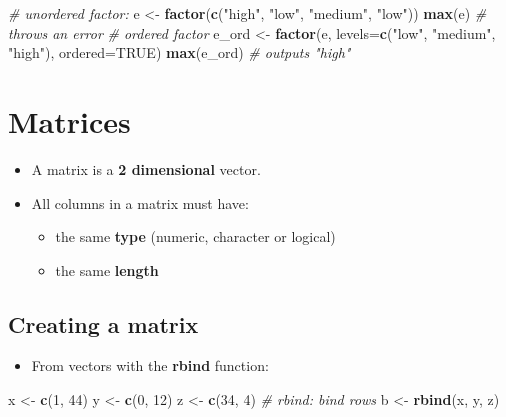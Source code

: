 \documentclass[]{book}
\newenvironment{Shaded}{\begin{snugshade}}{\end{snugshade}}
\newcommand{\CommentTok}[1]{\textcolor[rgb]{0.56,0.35,0.01}{\textit{#1}}}
\newcommand{\DataTypeTok}[1]{\textcolor[rgb]{0.13,0.29,0.53}{#1}}
\newcommand{\DecValTok}[1]{\textcolor[rgb]{0.00,0.00,0.81}{#1}}
\newcommand{\KeywordTok}[1]{\textcolor[rgb]{0.13,0.29,0.53}{\textbf{#1}}}
\newcommand{\NormalTok}[1]{#1}
\newcommand{\OtherTok}[1]{\textcolor[rgb]{0.56,0.35,0.01}{#1}}
\newcommand{\StringTok}[1]{\textcolor[rgb]{0.31,0.60,0.02}{#1}}
\providecommand{\tightlist}{%
  \setlength{\itemsep}{0pt}\setlength{\parskip}{0pt}}
\begin{document}
\begin{Shaded}
\begin{Highlighting}[]
\CommentTok{# unordered factor:}
\NormalTok{e <-}\StringTok{ }\KeywordTok{factor}\NormalTok{(}\KeywordTok{c}\NormalTok{(}\StringTok{"high"}\NormalTok{, }\StringTok{"low"}\NormalTok{, }\StringTok{"medium"}\NormalTok{, }\StringTok{"low"}\NormalTok{))}
\KeywordTok{max}\NormalTok{(e) }\CommentTok{# throws an error}
\CommentTok{# ordered factor}
\NormalTok{e_ord <-}\StringTok{ }\KeywordTok{factor}\NormalTok{(e, }\DataTypeTok{levels=}\KeywordTok{c}\NormalTok{(}\StringTok{"low"}\NormalTok{, }\StringTok{"medium"}\NormalTok{, }\StringTok{"high"}\NormalTok{), }\DataTypeTok{ordered=}\OtherTok{TRUE}\NormalTok{)}
\KeywordTok{max}\NormalTok{(e_ord) }\CommentTok{# outputs "high"}
\end{Highlighting}
\end{Shaded}

\hypertarget{matrices}{%
\section{Matrices}\label{matrices}}

\begin{itemize}
\item
  A matrix is a \textbf{2 dimensional} vector.
\item
  All columns in a matrix must have:

  \begin{itemize}
  \tightlist
  \item
    the same \textbf{type} (numeric, character or logical)
  \item
    the same \textbf{length}
  \end{itemize}
\end{itemize}

\hypertarget{creating-a-matrix}{%
\subsection{Creating a matrix}\label{creating-a-matrix}}

\begin{itemize}
\tightlist
\item
  From vectors with the \textbf{rbind} function:
\end{itemize}

\begin{Shaded}
\begin{Highlighting}[]
\NormalTok{x <-}\StringTok{ }\KeywordTok{c}\NormalTok{(}\DecValTok{1}\NormalTok{, }\DecValTok{44}\NormalTok{)}
\NormalTok{y <-}\StringTok{ }\KeywordTok{c}\NormalTok{(}\DecValTok{0}\NormalTok{, }\DecValTok{12}\NormalTok{)}
\NormalTok{z <-}\StringTok{ }\KeywordTok{c}\NormalTok{(}\DecValTok{34}\NormalTok{, }\DecValTok{4}\NormalTok{)}
\CommentTok{# rbind: bind rows}
\NormalTok{b <-}\StringTok{ }\KeywordTok{rbind}\NormalTok{(x, y, z)}
\end{Highlighting}
\end{Shaded}
\end{document}
